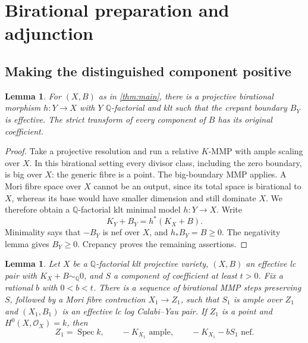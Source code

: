 \documentclass[11pt]{article}
\numberwithin{equation}{section}
\newtheorem{lemma}[theorem]{Lemma}
\theoremstyle{definition}
\newcommand{\Q}{\mathbb Q}
\newcommand{\OO}{\mathcal O}
\newcommand{\Spec}{\operatorname{Spec}}
\newcommand{\simq}{\sim_{\Q}}
\begin{document}
\section{Birational preparation and adjunction}\label{sec:preparation}

\subsection{Making the distinguished component positive}

\begin{lemma}\label{lem:klt-model}
For $(X,B)$ as in \cref{thm:main}, there is a projective birational
morphism $h:Y\to X$ with $Y$ $\Q$-factorial and klt such that the
crepant boundary $B_Y$ is effective. The strict transform of every
component of $B$ has its original coefficient.
\end{lemma}

\begin{proof}
Take a projective resolution and run a relative $K$-MMP with ample
scaling over $X$. In this birational setting every divisor class,
including the zero boundary, is big over $X$: the generic fibre is a
point. The big-boundary MMP applies. A Mori fibre space over $X$
cannot be an output, since its total space is birational to $X$,
whereas its base would have smaller dimension and still dominate $X$.
We therefore obtain a $\Q$-factorial klt minimal model $h:Y\to X$.
Write
\[
 K_Y+B_Y=h^*(K_X+B).
\]
Minimality says that $-B_Y$ is nef over $X$, and $h_*B_Y=B\geq0$.
The negativity lemma gives $B_Y\geq0$. Crepancy proves the remaining
assertions.
\end{proof}

\begin{lemma}\label{lem:positive-component}
Let $X$ be a $\Q$-factorial klt projective variety, $(X,B)$ an effective
lc pair with $K_X+B\simq0$, and $S$ a component of coefficient at
least $t>0$. Fix a rational $b$ with $0<b<t$. There is a sequence of
birational MMP steps preserving $S$, followed by a Mori fibre
contraction $X_1\to Z_1$, such that $S_1$ is ample over $Z_1$ and
$(X_1,B_1)$ is an effective lc log Calabi--Yau pair. If $Z_1$ is a
point and $H^0(X,\OO_X)=k$, then
\[
 Z_1=\Spec k,\qquad -K_{X_1}\text{ ample},\qquad
 -K_{X_1}-bS_1\text{ nef}.
\]
\end{lemma}
\end{document}
